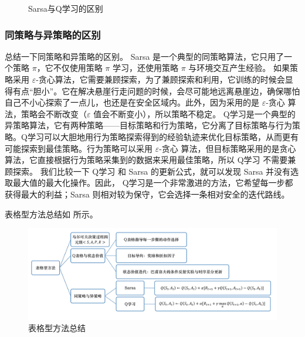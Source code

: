 \begin{figure}[htb]
	\centering
	\caption{Sarsa与Q学习的区别}
	\label{fig:fig3.19}
\end{figure}

\subsubsection{同策略与异策略的区别} 

总结一下同策略和异策略的区别。
	Sarsa 是一个典型的同策略算法，它只用了一个策略 $\pi$，它不仅使用策略 $\pi$ 学习，还使用策略 $\pi$ 与环境交互产生经验。
	如果策略采用 $\varepsilon$-贪心算法，它需要兼顾探索，为了兼顾探索和利用，它训练的时候会显得有点“胆小”。它在解决悬崖行走问题的时候，会尽可能地远离悬崖边，确保哪怕自己不小心探索了一点儿，也还是在安全区域内。此外，因为采用的是 $\varepsilon$-贪心 算法，策略会不断改变（$\varepsilon$ 值会不断变小），所以策略不稳定。
	Q学习是一个典型的异策略算法，它有两种策略------目标策略和行为策略，它分离了目标策略与行为策略。Q学习可以大胆地用行为策略探索得到的经验轨迹来优化目标策略，从而更有可能探索到最佳策略。行为策略可以采用 $\varepsilon$-贪心 算法，但目标策略采用的是贪心算法，它直接根据行为策略采集到的数据来采用最佳策略，所以 Q学习 不需要兼顾探索。
	我们比较一下 Q学习 和 Sarsa 的更新公式，就可以发现 Sarsa 并没有选取最大值的最大化操作。因此，
	Q学习是一个非常激进的方法，它希望每一步都获得最大的利益；Sarsa 则相对较为保守，它会选择一条相对安全的迭代路线。

表格型方法总结如 所示。
\begin{figure}[htb]
	\centering
	\includegraphics[width=0.7\linewidth]{res/ch3/3.21}
	\caption{表格型方法总结}
	\label{fig:tabular_methods_summary}
\end{figure}

